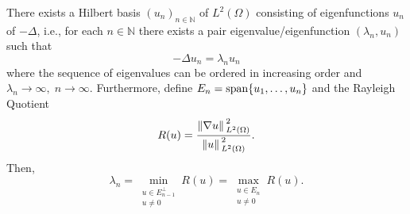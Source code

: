 \begin{theorem}\label{spec_lap_pre}
    There exists a Hilbert basis \((u_n)_{n \in \mathbb{N}}\) of \(L^2(\Omega)\) consisting of eigenfunctions \(u_n\) of \(-\Delta\), i.e., for each \(n \in \mathbb{N}\) there exists a pair eigenvalue/eigenfunction \((\lambda_n, u_n)\) such that
    \[
        -\Delta u_n = \lambda_n u_n
    \]
    where the sequence of eigenvalues can be ordered in increasing order and \(\lambda_n \rightarrow \infty, \; n \rightarrow \infty\). Furthermore, define \(E_n = \operatorname{span}\{u_1, \dots, u_n\}\) and the Rayleigh Quotient
    \[
        R(u) = \frac{\norm*{\nabla u}^2_{L^2(\Omega)}}{\norm*{u}^2_{L^2(\Omega)}}.
    \]
    Then,
    \begin{equation}\label{append_variational_form_laplacian}
    \lambda_n = \min_{\substack{u \in E^\perp_{n-1} \\ u \neq 0}} R(u) = \max_{\substack{u \in E_n \\ u \neq 0}} R(u).
    \end{equation}
\end{theorem}
